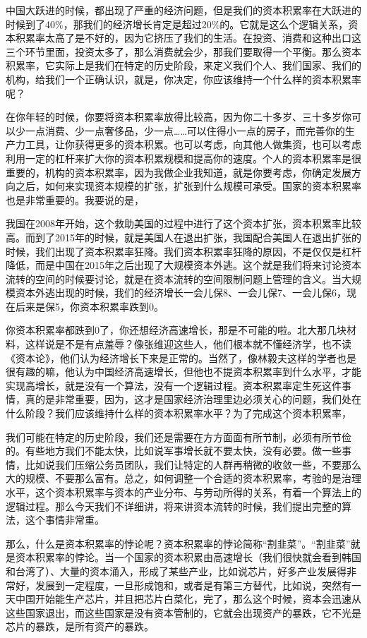 \documentclass[UTF8, 12pt, a4paper]{ctexrep}
\begin{document}
中国大跃进的时候，都出现了严重的经济问题，但是我们的资本积累率在大跃进的时候到了40\%，那我们的经济增长肯定是超过20\%的。它就是这么个逻辑关系，资本积累率太高了是不好的，因为它挤压了我们的生活。在投资、消费和这种出口这三个环节里面，投资太多了，那么消费就会少，那我们要取得一个平衡。那么资本积累率，它实际上是我们在特定的历史阶段，来定义我们个人、我们国家、我们的机构，给我们一个正确认识，就是，你决定，你应该维持一个什么样的资本积累率呢？

在你年轻的时候，你要将资本积累率放得比较高，因为你二十多岁、三十多岁你可以少一点消费、少一点奢侈品，少一点……可以住得小一点的房子，而完善你的生产力工具，让你获得更多的资本积累。也可以考虑，向其他人做集资，也可以考虑利用一定的杠杆来扩大你的资本积累规模和提高你的速度。个人的资本积累率是很重要的，机构的资本积累率，因为我做企业我知道，就是你要考虑，你确定发展方向之后，如何来实现资本规模的扩张，扩张到什么规模可承受。国家的资本积累率也是非常重要的。我要说的是，

我国在2008年开始，这个救助美国的过程中进行了这个资本扩张，资本积累率比较高。而到了2015年的时候，就是美国人在退出扩张，我国配合美国人在退出扩张的时候，我们出现了资本积累率狂降。我们资本积累率狂降的原因，不是仅仅是杠杆降低，而是中国在2015年之后出现了大规模资本外逃。这个就是我们将来讨论资本流转的空间的时候要讨论，就是在资本流转的空间限制问题上管理的含义。当大规模资本外逃出现的时候，我们的经济增长一会儿保8、一会儿保7、一会儿保6，现在后来是保5，你资本积累率跌到0。

你资本积累率都跌到0了，你还想经济高速增长，那是不可能的啦。北大那几块材料，这样说是不是有点羞辱？像张维迎这些人，他们根本就不懂经济学，也不读《资本论》，他们认为经济增长下来是正常的。当然了，像林毅夫这样的学者也是很有趣的嘛，他认为中国经济高速增长，但他也不提资本积累率到什么水平，才能实现高增长，就是没有一个算法，没有一个逻辑过程。资本积累率定生死这件事情，真的是非常重要，因为，这才是国家经济治理里边必须关心的问题，我们处在什么阶段？我们应该维持什么样的资本积累率水平？为了完成这个资本积累率，

我们可能在特定的历史阶段，我们还是需要在方方面面有所节制，必须有所节俭的。有些地方我们不能太快，比如说军事增长就不要太快，没有必要。做一些事情，比如说我们压缩公务员团队，我们让特定的人群再稍微的收敛一些，不要那么大的规模、不要那么富有。总之，如何调整一个合适的资本积累率，考验的是治理水平，这个资本积累率与资本的产业分布、与劳动所得的关系，有着一个算法上的逻辑过程。那么今天我们不详细讲，将来讲资本流转的时候，我们提出完整的算法，这个事情非常重。

那么，什么是资本积累率的悖论呢？资本积累率的悖论简称“割韭菜”。“割韭菜”就是资本积累率的悖论。当一个国家的资本积累由高速增长（我们很快就会看到韩国和台湾了）、大量的资本涌入，形成了某些产业，比如说芯片，好多产业发展得非常好，发展到一定程度，一旦形成饱和，或者是有第三方替代，比如说，突然有一天中国开始能生产芯片，并且把芯片白菜化，完了，那么这个时候，资本会迅速从这些国家退出，而这些国家是没有资本管制的，它就会出现资产的暴跌，它不光是芯片的暴跌，是所有资产的暴跌。
\end{document}
